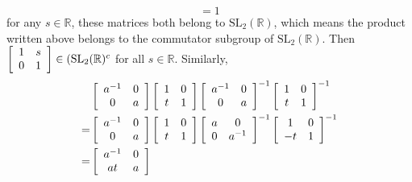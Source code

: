 \documentclass{article}
\begin{document}
\begin{Answer}
\begin{enumerate}[(a)]
{$$       = 1
       $$
       for any $s \in \mathbb{R}$,
       these matrices both belong to $\mathrm{SL}_2(\mathbb{R})$,
       which means the product written above belongs to the commutator subgroup of
       $\mathrm{SL}_2(\mathbb{R})$. Then
       $
       \left[\begin{array}{c c}
         1 & s \\ 0 & 1
       \end{array}\right] \in (\mathrm{SL}_2(\mathbb{R})^c
       $ for all $s \in \mathbb{R}$. Similarly,
       \begin{align*}
         &\left[\begin{array}{c c}
            a^{-1} & 0 \\ 0 & a
          \end{array}\right]
          \left[\begin{array}{c c}
            1 & 0 \\ t & 1
          \end{array}\right]
          \left[\begin{array}{c c}
            a^{-1} & 0 \\ 0 & a
          \end{array}\right]^{-1}
          \left[\begin{array}{c c}
            1 & 0 \\ t & 1
          \end{array}\right]^{-1} \\
        =&\left[\begin{array}{c c}
            a^{-1} & 0 \\ 0 & a
          \end{array}\right]
          \left[\begin{array}{c c}
            1 & 0 \\ t & 1
          \end{array}\right]
          \left[\begin{array}{c c}
            a & 0 \\ 0 & a^{-1}
          \end{array}\right]^{-1}
          \left[\begin{array}{c c}
            1 & 0 \\ -t & 1
          \end{array}\right]^{-1} \\
        =&\left[\begin{array}{c c}
            a^{-1} & 0 \\ at & a
          \end{array}\right]

\end{align*}}
\end{enumerate}
\end{Answer}
\end{document}
